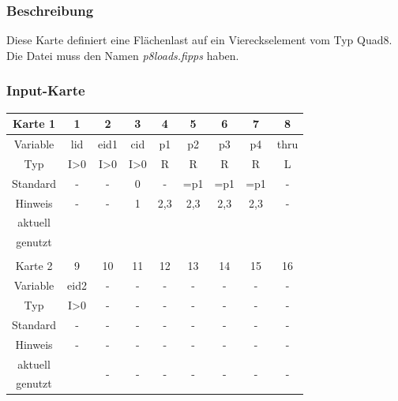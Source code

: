\documentclass[11pt,titlepage,listof=totoc,bibliography=totoc,twoside]{scrreprt}
\begin{document}
{{\subsubsection{Beschreibung}

Diese Karte definiert eine Flächenlast auf ein Viereckselement vom Typ Quad8.\\
Die Datei muss den Namen \emph{p8loads.fipps} haben.

\subsubsection{Input-Karte}

\begin{table}[htbp]
\centering
\begin{tabularx}{\textwidth}{cCCCCCCCC}
\toprule
Karte 1	& 1		& 2		& 3		& 4		& 5		& 6		& 7		& 8	\\
\midrule
Variable& lid		& eid1		& cid		& p1		& p2		& p3		& p4		& thru	\\
Typ	& I>0		& I>0		& I>0		& R		& R		& R		& R		& L	\\
Standard& -		& -		& 0		& -		& =p1		& =p1		& =p1		& -	\\
Hinweis	& -		& -		& 1		& 2,3		& 2,3		& 2,3		& 2,3		& -	\\
aktuell	& 	& 	& 	& 	& 	& 	& 	& 	\\
genutzt \\
\\
Karte 2	& 9		& 10		& 11		& 12			& 13		& 14		& 15		& 16		\\
\midrule
Variable& eid2		& -		& -		& -			& -		& -		& -		& -		\\
Typ	& I>0		& -		& -		& -			& -		& -		& -		& -		\\
Standard& -		& -		& -		& -			& -		& -		& -		& -		\\
Hinweis	& -		& -		& -		& -			& -		& -		& -		& -		\\
aktuell	& 	& 	& 	& 	& \multirow{2}{*}{-}	& 	& 	& 	\\
genutzt \\
\bottomrule
\end{tabularx}
\end{table}

}}
\end{document}
